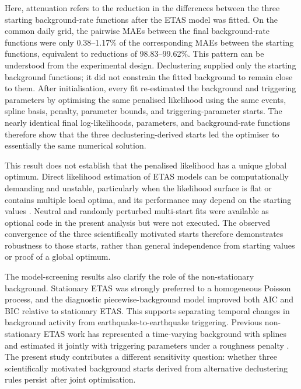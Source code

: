 Here, attenuation refers to the reduction in the differences between the
three starting background-rate functions after the ETAS model was fitted. On
the common daily grid, the pairwise MAEs between the final background-rate
functions were only 0.38--1.17\% of the corresponding MAEs between the
starting functions, equivalent to reductions of 98.83--99.62\%. This pattern
can be understood from the experimental design. Declustering supplied only
the starting background functions; it did not constrain the fitted
background to remain close to them. After initialisation, every fit
re-estimated the background and triggering parameters by optimising the same
penalised likelihood using the same events, spline basis, penalty, parameter
bounds, and triggering-parameter starts. The nearly identical final
log-likelihoods, parameters, and background-rate functions therefore show
that the three declustering-derived starts led the optimiser to essentially
the same numerical solution.

This result does not establish that the penalised likelihood has a unique
global optimum. Direct likelihood estimation of ETAS models can be
computationally demanding and unstable, particularly when the likelihood
surface is flat or contains multiple local optima, and its performance may
depend on the starting values \citep{veen2008estimation,lombardi2015simulated}.
Neutral and randomly perturbed multi-start fits were available as optional
code in the present analysis but were not executed. The observed convergence
of the three scientifically motivated starts therefore demonstrates
robustness to those starts, rather than general independence from starting
values or proof of a global optimum.

The model-screening results also clarify the role of the non-stationary
background. Stationary ETAS was strongly preferred to a homogeneous Poisson
process, and the diagnostic piecewise-background model improved both AIC and
BIC relative to stationary ETAS. This supports separating temporal changes in
background activity from earthquake-to-earthquake triggering. Previous
non-stationary ETAS work has represented a time-varying background with
splines and estimated it jointly with triggering parameters under a roughness
penalty \citep{kattamanchi2017nonstationary}. The present study contributes a
different sensitivity question: whether three scientifically motivated
background starts derived from alternative declustering rules persist after
joint optimisation.

